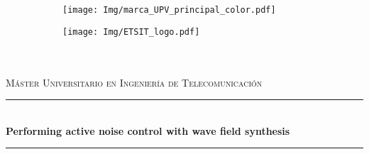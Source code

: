 \begin{titlepage}

\newcommand{\HRule}{\rule{\linewidth}{0.5mm}} %

\center %


\begin{figure}
	\centering
	\begin{subfigure}[b]{0.49\textwidth}
		\centering
		\texttt{[image: Img/marca\_UPV\_principal\_color.pdf]}
	\end{subfigure}
	\begin{subfigure}[b]{0.49\textwidth}
		\centering
		\texttt{[image: Img/ETSIT\_logo.pdf]}
	\end{subfigure}
\end{figure}
\quad\\
\vspace{20mm}
\quad\\

\textsc{\large M\'{a}ster Universitario en Ingenier\'{i}a de Telecomunicaci\'{o}n}\\[0.5cm]

 

\author{
	Rub\'{e}n Chuli\'{a} Mena \\
	Tutor: Mar\'ia de Diego Ant\'on \\
	Co-tutor: Miguel Ferrer Contreras
}
\date{\today}

\HRule \\[0.4cm]
{ \huge \bfseries Performing active noise control with wave field synthesis}\\[0.4cm] %
\HRule \\[1.5cm]
 


\end{titlepage}

